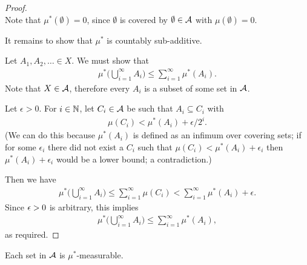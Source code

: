 \begin{proof}~\\
  Note that $\mu^*(\emptyset) = 0$, since $\emptyset$ is covered by $\emptyset \in \mathcal A$ with $\mu(\emptyset) = 0$.

  It remains to show that $\mu^*$ is countably sub-additive.

  Let $A_1, A_2, \dots \in X$. We must show that
  \begin{align*}
    \mu^*\Big(\bigcup_{i=1}^\infty A_i\Big) \leq \sum_{i=1}^\infty \mu^*(A_i).
  \end{align*}
  Note that $X \in \mathcal A$, therefore every $A_i$ is a subset of some set in $\mathcal A$.

  Let $\epsilon > 0$. For $i \in \mathbb{N}$, let $C_i \in \mathcal A$ be such that $A_i \subseteq C_{i}$ with
  \begin{align*}
    \mu(C_{i}) < \mu^*(A_i) + \epsilon/2^i.
  \end{align*}
  (We can do this because $\mu^*(A_i)$ is defined as an infimum over covering sets; if for some $\epsilon_i$
  there did not exist a $C_i$ such that $\mu(C_{i}) < \mu^*(A_i) + \epsilon_i$ then $\mu^*(A_i) + \epsilon_i$
  would be a lower bound; a contradiction.)

  Then we have
  \begin{align*}
    \mu^*\Big(\bigcup_{i=1}^\infty A_i\Big) \leq \sum_{i=1}^\infty \mu(C_{i}) < \sum_{i=1}^\infty \mu^*(A_i) + \epsilon.
  \end{align*}
  Since $\epsilon > 0$ is arbitrary, this implies
  \begin{align*}
    \mu^*\Big(\bigcup_{i=1}^\infty A_i\Big) \leq \sum_{i=1}^\infty \mu^*(A_i),
  \end{align*}
  as required.
\end{proof}






















\begin{claim*}
  Each set in $\mathcal A$ is $\mu^*$-measurable.
\end{claim*}

